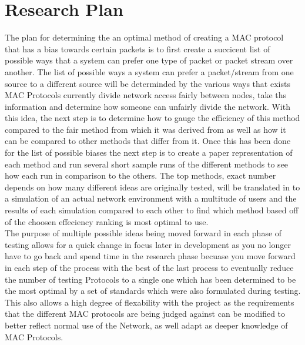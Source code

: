 \documentclass{sigcomm-alternate}
\begin{document}
\section{Research Plan}
{
The plan for determining the an optimal method of creating a MAC protocol that has a bias towards certain packets
is to first create a succicent list of possible ways that a system can prefer one type of packet or packet stream over another.
 The list of possible ways a system can prefer a packet/stream from one source to a different source will be determinded by
 the various ways that exists MAC Protocols currently divide network access fairly between nodes, take ths information and 
determine how someone can unfairly divide the network. With this idea, the next step is to determine how to gauge the 
efficiency of this method compared to the fair method from which it was derived from as well as how it can be compared to
 other methods that differ from it. Once this has been done for the list of possible biases the next step is to create a paper
 representation of each method and run several short sample runs of the different methods to see how each run in comparison 
to the others. The top methods, exact number depends on how many different ideas are originally tested, will be translated
 in to a simulation of an actual network environment with a multitude of users and the results of each simulation compared to 
each other to find which method based off of the choosen effeciency ranking is most optimal to use. \\
\indent The purpose of multiple possible ideas being moved forward in each phase of testing allows for a quick change in 
focus later in development as you no longer have to go back and spend time in the research phase becuase you move forward
 in each step of the process with the best of the last process to eventually reduce the number of testing Protocols to a single 
one which has been determined to be the most optimal by a set of standards which were also formulated during testing.
 This also allows a high degree of flexability with the project as the requirements that the different MAC protocols are being 
judged against can be modified to better reflect normal use of the Network, as well adapt as deeper knowledge of  MAC Protocols.
}
\end{document}
